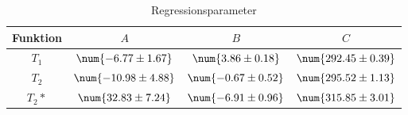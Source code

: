 \begin{table}
 \centering
 \begin{tabular}{S S S S }
 \toprule
{Funktion} & {$A$} & {$B$} & {$C$} \\
\midrule
 {$T_1$} & $\num{-6.77 \pm 1.67}$ & $\num{3.86\pm 0.18}$ & $\num{292.45 \pm 0.39}$ \\
{$T_2$} & $\num{-10.98 \pm 4.88}$ & $\num{-0.67 \pm 0.52}$ & $\num{295.52 \pm 1.13}$ \\
{$T_2*$} & $\num{32.83 \pm 7.24}$ & $\num{-6.91\pm 0.96}$ & $\num{315.85 \pm 3.01}$ \\
\bottomrule
 \end{tabular}
 \caption{Regressionsparameter}
 \label{tab: regress}
  \end{table}
